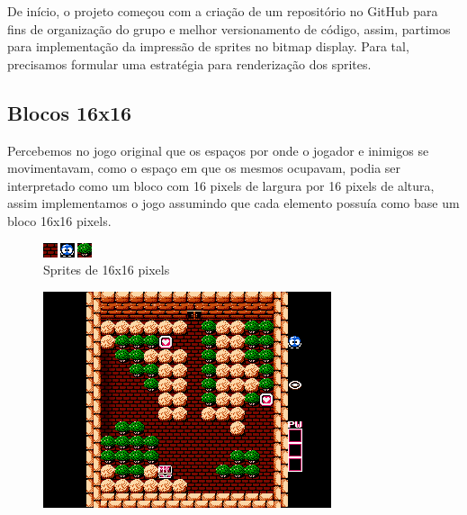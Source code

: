 \documentclass[10pt, conference, compsocconf]{IEEEtran}
\begin{document}
De início, o projeto começou com a criação de um repositório no GitHub para fins
de organização do grupo e melhor versionamento de código, assim, partimos para
implementação da impressão de sprites no bitmap display. Para tal, precisamos
formular uma estratégia para renderização dos sprites.

\subsection{Blocos 16x16}{
\label{sec:MIPS}

Percebemos no jogo original que os espaços por onde
o jogador e inimigos se movimentavam, como o espaço
em que os mesmos ocupavam, podia ser interpretado
como um bloco com 16 pixels de largura por 16 pixels de altura, assim implementamos o jogo assumindo
que cada elemento possuía como base um bloco 16x16
pixels.

}

\begin{figure}[htb]
  \begin{center}
   \includegraphics[width=0.7\linewidth]{./Figures/image_2e3e4.png}
  \end{center}
  \caption{Sprites de 16x16 pixels}
  \label{fig:02}
\end{figure}

\begin{figure}[htb]
  \begin{center}
   \includegraphics[width=0.9\linewidth]{./Figures/image_5.png}
  \end{center}
  \label{fig:01}
\end{figure}
\end{document}
